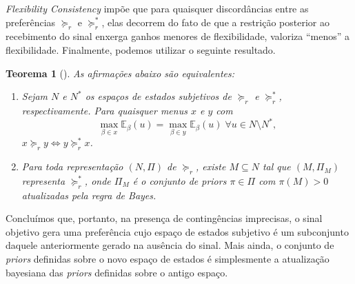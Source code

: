 \documentclass[11pt, a4paper]{article}
\theoremstyle{nonumberplain}
\theoremstyle{plain}
\newtheorem{theorem}{Teorema}
\theoremstyle{plain}
\theoremstyle{plain}
\theoremstyle{nonumberplain}
\begin{document}
\emph{Flexibility Consistency} impõe que para quaisquer discordâncias entre as preferências $\succcurlyeq_r$ e $\succcurlyeq^*_r$, elas decorrem do fato de que a restrição posterior ao recebimento do sinal enxerga ganhos menores de flexibilidade, valoriza ``menos'' a flexibilidade. Finalmente, podemos utilizar o seguinte resultado.

\begin{theorem}[\cite{Moura2013}]
As afirmações abaixo são equivalentes:
\begin{enumerate}[1.]
\item Sejam $N$ e $N^*$ os espaços de estados subjetivos de $\succcurlyeq_r$ e $\succcurlyeq^*_r$, respectivamente. Para quaisquer menus $x$ e $y$ com 
$$\max_{\beta\in x}\mathbb{E}_\beta(u) = \max_{\beta\in y}\mathbb{E}_\beta(u)\;\forall u\in N\setminus N^*,$$
$x\succcurlyeq_r y \Leftrightarrow y\succcurlyeq^*_r x$.
\item Para toda representação $(N,\Pi)$ de $\succcurlyeq_r$, existe $M\subseteq N$ tal que $(M,\Pi_M)$ representa $\succcurlyeq_r^*$, onde $\Pi_M$ é o conjunto de \emph{priors} $\pi\in \Pi$ com $\pi(M)>0$ atualizadas pela regra de Bayes.
\end{enumerate}
\end{theorem}       

Concluímos que, portanto, na presença de contingências imprecisas, o sinal objetivo gera uma preferência cujo espaço de estados subjetivo é um subconjunto daquele anteriormente gerado na ausência do sinal. Mais ainda, o conjunto de \emph{priors} definidas sobre o novo espaço de estados é simplesmente a atualização bayesiana das \emph{priors} definidas sobre o antigo espaço.  
\end{document}
